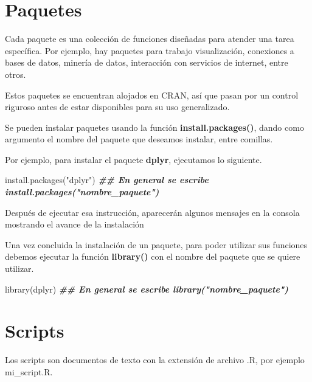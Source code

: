 \documentclass[
  12pt,
]{book}
\newenvironment{Shaded}{\begin{snugshade}}{\end{snugshade}}
\newcommand{\DocumentationTok}[1]{\textcolor[rgb]{0.56,0.35,0.01}{\textbf{\textit{#1}}}}
\newcommand{\FunctionTok}[1]{\textcolor[rgb]{0.00,0.00,0.00}{#1}}
\newcommand{\NormalTok}[1]{#1}
\newcommand{\StringTok}[1]{\textcolor[rgb]{0.31,0.60,0.02}{#1}}
\begin{document}
\hypertarget{paquetes}{%
\section{\texorpdfstring{\textbf{Paquetes}}{Paquetes}}\label{paquetes}}

Cada paquete es una colección de funciones diseñadas para atender una tarea específica. Por ejemplo, hay paquetes para trabajo visualización, conexiones a bases de datos, minería de datos, interacción con servicios de internet, entre otros.

Estos paquetes se encuentran alojados en CRAN, así que pasan por un control riguroso antes de estar disponibles para su uso generalizado.

Se pueden instalar paquetes usando la función \textbf{install.packages()}, dando como argumento el nombre del paquete que deseamos instalar, entre comillas.

Por ejemplo, para instalar el paquete \textbf{dplyr}, ejecutamos lo siguiente.

\begin{Shaded}
\begin{Highlighting}[]
\FunctionTok{install.packages}\NormalTok{(}\StringTok{"dplyr"}\NormalTok{) }\DocumentationTok{\#\# En general se escribe  install.packages("nombre\_paquete")}
\end{Highlighting}
\end{Shaded}

Después de ejecutar esa instrucción, aparecerán algunos mensajes en la consola mostrando el avance de la instalación

Una vez concluida la instalación de un paquete, para poder utilizar sus funciones debemos ejecutar la función \textbf{library()} con el nombre del paquete que se quiere utilizar.

\begin{Shaded}
\begin{Highlighting}[]
\FunctionTok{library}\NormalTok{(dplyr)   }\DocumentationTok{\#\# En general se escribe  library("nombre\_paquete")}
\end{Highlighting}
\end{Shaded}

\hypertarget{scripts}{%
\section{\texorpdfstring{\textbf{Scripts}}{Scripts}}\label{scripts}}

Los scripts son documentos de texto con la extensión de archivo .R, por ejemplo mi\_script.R.
\end{document}
